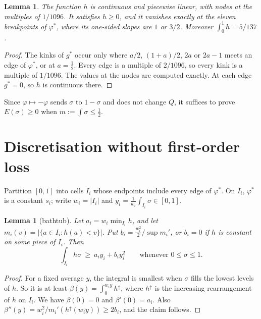 \documentclass[11pt]{article}
\newtheorem{lemma}[theorem]{Lemma}
\newcommand{\vphi}{\varphi}
\begin{document}
\begin{lemma}\label{lem:h}
The function $h$ is continuous and piecewise linear, with nodes at the multiples of $1/1096$.
It satisfies $h\ge0$, and it vanishes exactly at the eleven breakpoints of $\vphi^*$, where its
one-sided slopes are $1$ or $3/2$. Moreover $\int_0^1h=5/137$.
\end{lemma}
\begin{proof}
The kinks of $g^*$ occur only where $a/2$, $(1+a)/2$, $2a$ or $2a-1$ meets an edge of $\vphi^*$,
or at $a=\frac12$. Every edge is a multiple of $2/1096$, so every kink is a multiple of $1/1096$.
The values at the nodes are computed exactly. At each edge $g^*=0$, so $h$ is continuous there.
\end{proof}

Since $\vphi\mapsto-\vphi$ sends $\sigma$ to $1-\sigma$ and does not change $Q$, it suffices to prove
$E(\sigma)\ge0$ when $m:=\int\sigma\le\frac12$.

\section{Discretisation without first-order loss}
Partition $[0,1]$ into cells $I_i$ whose endpoints include every edge of $\vphi^*$. On $I_i$,
$\vphi^*$ is a constant $s_i$; write $w_i=|I_i|$ and $y_i=\frac1{w_i}\int_{I_i}\sigma\in[0,1]$.

\begin{lemma}[bathtub]\label{lem:bath}
Let $a_i=w_i\min_{I_i}h$, and let $m_i(v)=|\{a\in I_i: h(a)<v\}|$. Put
$b_i=\frac{w_i^2}{2}\big/\sup m_i'$, or $b_i=0$ if $h$ is constant on some piece of $I_i$. Then
\[\int_{I_i}h\sigma\ \ge\ a_iy_i+b_iy_i^2\qquad\text{whenever }0\le\sigma\le1.\]
\end{lemma}
\begin{proof}
For a fixed average $y$, the integral is smallest when $\sigma$ fills the lowest levels of $h$.
So it is at least $\beta(y)=\int_0^{w_iy}h^{\uparrow}$, where $h^{\uparrow}$ is the increasing
rearrangement of $h$ on $I_i$. We have $\beta(0)=0$ and $\beta'(0)=a_i$. Also
$\beta''(y)=w_i^2/m_i'(h^\uparrow(w_iy))\ge 2b_i$, and the claim follows.
\end{proof}
\end{document}
